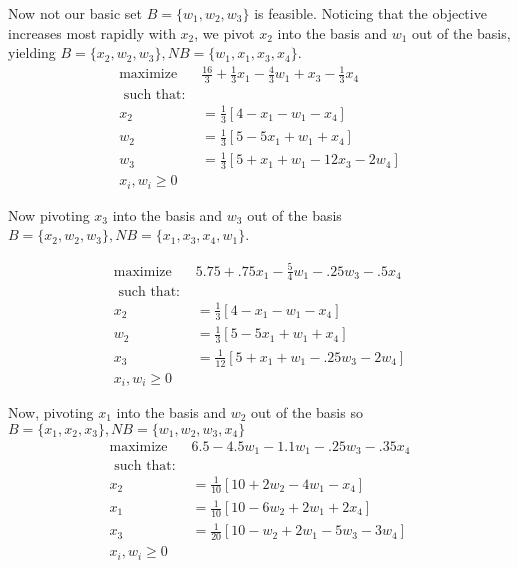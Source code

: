 \documentclass[12pt,letterpaper]{article}
\begin{document}
\begin{enumerate}
Now not our basic set $B = \{ w_1, w_2, w_3 \}$ is feasible. Noticing that the objective increases most rapidly with $x_2$, we pivot $x_2$ into the basis and $w_1$ out of the basis, yielding $B = \{ x_2, w_2, w_3 \}, NB = \{w_1, x_1, x_3, x_4 \}$.
\begin{equation*}
\begin{aligned}
\mbox{maximize } & \frac{16}{3}  + \frac{1}{3} x_1 - \frac{4}{3}w_1+ x_3 - \frac{1}{3} x_4 \\ 
\mbox{ such that: } & \\ 
x_2 &= \frac{1}{3}[ 4 -  x_1 -  w_1 -  x_4] \\ 
w_2 &= \frac{1}{3} [ 5 - 5x_1  + w_1  + x_4]  \\ 
w_3 &= \frac{1}{3} [ 5 + x_1 + w_1  - 12 x_3 - 2 w_4]  \\ 
x_i, w_i \geq 0
\end{aligned}
\end{equation*}

Now pivoting $x_3$ into the basis and $w_3$ out of the basis $ B = \{x_2, w_2, w_3 \}, NB = \{x_1, x_3, x_4, w_1 \}$. 

\begin{equation*}
\begin{aligned}
\mbox{maximize } & 5.75  + .75 x_1 - \frac{5}{4}w_1 - .25 w_3 - .5 x_4 \\ 
\mbox{ such that: } & \\ 
x_2 &= \frac{1}{3}[ 4 -  x_1 -  w_1 -  x_4] \\ 
w_2 &= \frac{1}{3} [ 5 - 5x_1  + w_1  + x_4]  \\ 
x_3 &= \frac{1}{12} [ 5 + x_1 + w_1  - .25 w_3 -  2 w_4]  \\ 
x_i, w_i \geq 0
\end{aligned}
\end{equation*}

Now, pivoting $x_1$ into the basis and $w_2$ out of the basis so $B= \{x_1, x_2, x_3 \}, NB = \{w_1, w_2, w_3, x_4\}$
\begin{equation*}
\begin{aligned}
\mbox{maximize } & 6.5  - 4.5 w_1 - 1.1w_1 - .25 w_3 - .35 x_4 \\ 
\mbox{ such that: } & \\ 
x_2 &= \frac{1}{10}[ 10 + 2 w_2 -  4 w_1 -  x_4] \\ 
x_1 &= \frac{1}{10} [10  - 6 w_2 + 2 w_1  + 2x_4]  \\ 
x_3 &= \frac{1}{20} [10 - w_2 + 2 w_1  - 5 w_3 -  3 w_4]  \\ 
x_i, w_i \geq 0
\end{aligned}
\end{equation*}


\end{enumerate}
\end{document}
